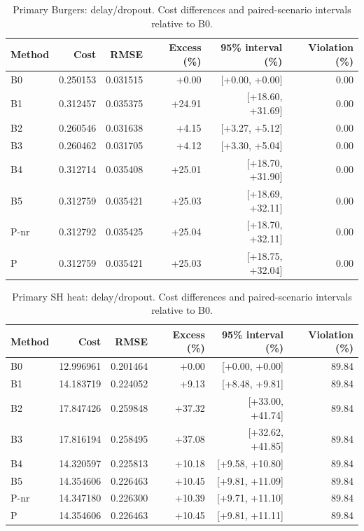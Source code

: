 \clearpage
\begin{table}[ht]
\centering\small
\caption{Primary Burgers: delay/dropout. Cost differences and paired-scenario intervals relative to B0.}
\begin{tabular}{@{}lrrrrr@{}}\toprule
Method & Cost & RMSE & Excess (\%) & 95\% interval (\%) & Violation (\%)\\\midrule
B0 & 0.250153 & 0.031515 & +0.00 & [+0.00, +0.00] & 0.00\\
B1 & 0.312457 & 0.035375 & +24.91 & [+18.60, +31.69] & 0.00\\
B2 & 0.260546 & 0.031638 & +4.15 & [+3.27, +5.12] & 0.00\\
B3 & 0.260462 & 0.031705 & +4.12 & [+3.30, +5.04] & 0.00\\
B4 & 0.312714 & 0.035408 & +25.01 & [+18.70, +31.90] & 0.00\\
B5 & 0.312759 & 0.035421 & +25.03 & [+18.69, +32.11] & 0.00\\
P-nr & 0.312792 & 0.035425 & +25.04 & [+18.70, +32.11] & 0.00\\
P & 0.312759 & 0.035421 & +25.03 & [+18.75, +32.04] & 0.00\\
\bottomrule\end{tabular}
\end{table}
\begin{table}[ht]
\centering\small
\caption{Primary SH heat: delay/dropout. Cost differences and paired-scenario intervals relative to B0.}
\begin{tabular}{@{}lrrrrr@{}}\toprule
Method & Cost & RMSE & Excess (\%) & 95\% interval (\%) & Violation (\%)\\\midrule
B0 & 12.996961 & 0.201464 & +0.00 & [+0.00, +0.00] & 89.84\\
B1 & 14.183719 & 0.224052 & +9.13 & [+8.48, +9.81] & 89.84\\
B2 & 17.847426 & 0.259848 & +37.32 & [+33.00, +41.74] & 89.84\\
B3 & 17.816194 & 0.258495 & +37.08 & [+32.62, +41.85] & 89.84\\
B4 & 14.320597 & 0.225813 & +10.18 & [+9.58, +10.80] & 89.84\\
B5 & 14.354606 & 0.226463 & +10.45 & [+9.81, +11.09] & 89.84\\
P-nr & 14.347180 & 0.226300 & +10.39 & [+9.71, +11.10] & 89.84\\
P & 14.354606 & 0.226463 & +10.45 & [+9.81, +11.11] & 89.84\\
\bottomrule\end{tabular}
\end{table}
\clearpage
